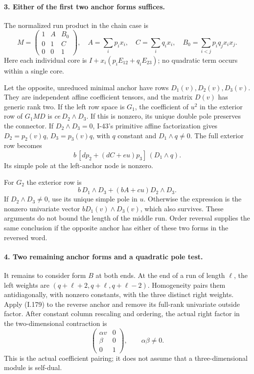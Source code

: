 \paragraph{3. Either of the first two anchor forms suffices.}
The normalized run product in the chain case is
\[
 M=\begin{pmatrix}1&A&B_0\\0&1&C\\0&0&1\end{pmatrix},
 \quad
 A=\sum_i p_ix_i,\quad C=\sum_i q_ix_i,\quad
 B_0=\sum_{i<j}p_iq_jx_ix_j.
 \tag{I.180}
\]
Here each individual core is
$I+x_i(p_iE_{12}+q_iE_{23})$; no quadratic term occurs
within a single core.

Let the opposite, unreduced minimal anchor have rows
$D_1(v),D_2(v),D_3(v)$. They are independent affine
coefficient tensors, and the matrix $D(v)$ has generic
rank two. If the left row space is $G_1$, the coefficient
of $u^2$ in the exterior row of $G_1MD$ is
$ce\,D_2\wedge D_3$. If this is nonzero, its unique double
pole preserves the connector. If $D_2\wedge D_3=0$,
I-43's primitive affine factorization gives
$D_2=p_2(v)q$, $D_3=p_3(v)q$, with $q$ constant and
$D_1\wedge q\ne0$. The full exterior row becomes
\[
 b\,[d p_2+(dC+e u)p_3]\,(D_1\wedge q).
 \tag{I.181}
\]
Its simple pole at the left-anchor node is nonzero.

For $G_2$ the exterior row is
\[
 b\,D_1\wedge D_3+(bA+c u)D_2\wedge D_3.
 \tag{I.182}
\]
If $D_2\wedge D_3\ne0$, use its unique simple pole in
$u$. Otherwise the expression is the nonzero univariate
vector $bD_1(v)\wedge D_3(v)$, which also survives.
These arguments do not bound the length of the middle run.
Order reversal supplies the same conclusion if the opposite
anchor has either of these two forms in the reversed word.

\paragraph{4. Two remaining anchor forms and a quadratic pole test.}
It remains to consider form $B$ at both ends. At the end
of a run of length $\ell$, the left weights are
$(q+\ell+2,q+\ell,q+\ell-2)$. Homogeneity pairs them
antidiagonally, with nonzero constants, with the three
distinct right weights. Apply (I.179) to the reverse anchor
and remove its full-rank univariate outside factor. After
constant column rescaling and ordering, the actual right
factor in the two-dimensional contraction is
\[
 \begin{pmatrix}\alpha v&0\\\beta&0\\0&1\end{pmatrix},
 \qquad \alpha\beta\ne0.
 \tag{I.183}
\]
This is the actual coefficient pairing; it does not assume
that a three-dimensional module is self-dual.

